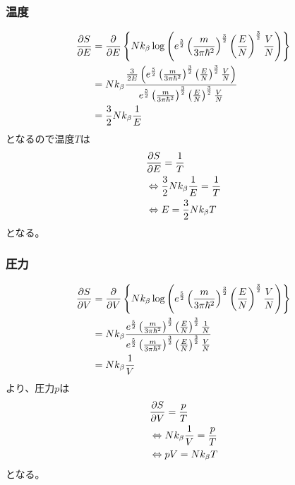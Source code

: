 \documentclass[dvipdfmx, 11pt, a4paper]{jsarticle}
\theoremstyle{definition}
\begin{document}
\subsubsection{温度}
    \begin{align}
        \frac{\partial S}{\partial E} &= \frac{\partial }{\partial E} \left\{ Nk_\beta \log \left( e^{\frac{5}{2}} \left(\frac{m}{3 \pi \hbar^2} \right)^{\frac{3}{2}} \left( \frac{E}{N} \right)^{\frac{3}{2}} \frac{V}{N} \right) \right\} \notag \\
        &= Nk_\beta \frac{ \frac{3}{2E}\left( e^{\frac{5}{2}} \left(\frac{m}{3 \pi \hbar^2} \right)^{\frac{3}{2}} \left(\frac{E}{N} \right)^{\frac{3}{2}} \frac{V}{N} \right)}{e^{\frac{5}{2}} \left(\frac{m}{3 \pi \hbar^2} \right)^{\frac{3}{2}} \left( \frac{E}{N} \right)^{\frac{3}{2}} \frac{V}{N}} \notag \\
        &=\frac{3}{2} N k_\beta \frac{1}{E} \notag 
    \end{align}
    となるので温度$T$は
    \begin{align}
        &\frac{\partial S}{\partial E} = \frac{1}{T} \notag \\
        &\Leftrightarrow  \frac{3}{2} N k_\beta \frac{1}{E} = \frac{1}{T} \notag \\
        &\Leftrightarrow E = \frac{3}{2}Nk_\beta T
    \end{align}
    となる。
\subsubsection{圧力}
    \begin{align}
        \frac{\partial S}{\partial V} &= \frac{\partial }{\partial V} \left\{ Nk_\beta \log \left( e^{\frac{5}{2}} \left(\frac{m}{3 \pi \hbar^2} \right)^{\frac{3}{2}} \left( \frac{E}{N} \right)^{\frac{3}{2}} \frac{V}{N} \right) \right\} \notag \\
        &= Nk_\beta \frac{e^{\frac{5}{2}} \left(\frac{m}{3 \pi \hbar^2} \right)^{\frac{3}{2}} \left( \frac{E}{N} \right)^{\frac{3}{2}} \frac{1}{N}}{e^{\frac{5}{2}} \left(\frac{m}{3 \pi \hbar^2} \right)^{\frac{3}{2}} \left( \frac{E}{N} \right)^{\frac{3}{2}} \frac{V}{N}} \notag \\
        &= Nk_\beta \frac{1}{V} \notag 
    \end{align}
    より、圧力$p$は
    \begin{align}
        &\frac{\partial S}{\partial V} = \frac{p}{T} \notag \\
        &\Leftrightarrow Nk_\beta \frac{1}{V} = \frac{p}{T} \notag \\
        &\Leftrightarrow pV = Nk_\beta T
    \end{align}
    となる。
\end{document}
